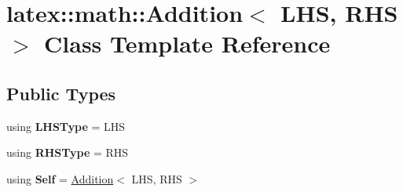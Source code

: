 \hypertarget{classlatex_1_1math_1_1Addition}{\section{latex\-:\-:math\-:\-:Addition$<$ L\-H\-S, R\-H\-S $>$ Class Template Reference}
\label{classlatex_1_1math_1_1Addition}
}
\subsection*{Public Types}
\begin{DoxyCompactItemize}
\item 
\hypertarget{classlatex_1_1math_1_1Addition_aaea872c65a92e8d4b30947abe9908517}{using {\bfseries L\-H\-S\-Type} = L\-H\-S}\label{classlatex_1_1math_1_1Addition_aaea872c65a92e8d4b30947abe9908517}

\item 
\hypertarget{classlatex_1_1math_1_1Addition_a0fe2a62eec58bbfd834b631f06c601c5}{using {\bfseries R\-H\-S\-Type} = R\-H\-S}\label{classlatex_1_1math_1_1Addition_a0fe2a62eec58bbfd834b631f06c601c5}

\item 
\hypertarget{classlatex_1_1math_1_1Addition_ac09b52f17f976ceef97ed19c2777c4a0}{using {\bfseries Self} = \hyperlink{classlatex_1_1math_1_1Addition}{Addition}$<$ L\-H\-S, R\-H\-S $>$}\label{classlatex_1_1math_1_1Addition_ac09b52f17f976ceef97ed19c2777c4a0}

\end{DoxyCompactItemize}
